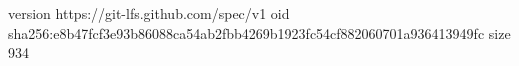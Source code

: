 version https://git-lfs.github.com/spec/v1
oid sha256:e8b47fcf3e93b86088ca54ab2fbb4269b1923fc54cf882060701a936413949fc
size 934
